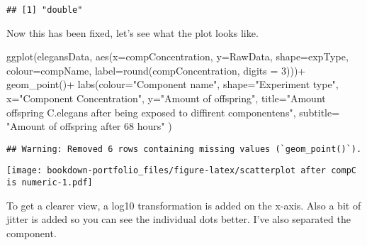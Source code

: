 \documentclass[
]{book}
\newenvironment{Shaded}{\begin{snugshade}}{\end{snugshade}}
\newcommand{\AttributeTok}[1]{\textcolor[rgb]{0.77,0.63,0.00}{#1}}
\newcommand{\DecValTok}[1]{\textcolor[rgb]{0.00,0.00,0.81}{#1}}
\newcommand{\FunctionTok}[1]{\textcolor[rgb]{0.00,0.00,0.00}{#1}}
\newcommand{\NormalTok}[1]{#1}
\newcommand{\SpecialCharTok}[1]{\textcolor[rgb]{0.00,0.00,0.00}{#1}}
\newcommand{\StringTok}[1]{\textcolor[rgb]{0.31,0.60,0.02}{#1}}
\begin{document}
\begin{verbatim}
## [1] "double"
\end{verbatim}

Now this has been fixed, let's see what the plot looks like.

\begin{Shaded}
\begin{Highlighting}[]
\FunctionTok{ggplot}\NormalTok{(elegansData, }\FunctionTok{aes}\NormalTok{(}\AttributeTok{x=}\NormalTok{compConcentration, }\AttributeTok{y=}\NormalTok{RawData, }\AttributeTok{shape=}\NormalTok{expType, }\AttributeTok{colour=}\NormalTok{compName, }\AttributeTok{label=}\FunctionTok{round}\NormalTok{(compConcentration, }\AttributeTok{digits =} \DecValTok{3}\NormalTok{)))}\SpecialCharTok{+}
  \FunctionTok{geom\_point}\NormalTok{()}\SpecialCharTok{+}
  \FunctionTok{labs}\NormalTok{(}\AttributeTok{colour=}\StringTok{"Component name"}\NormalTok{, }\AttributeTok{shape=}\StringTok{"Experiment type"}\NormalTok{,}
       \AttributeTok{x=}\StringTok{"Component Concentration"}\NormalTok{,}
       \AttributeTok{y=}\StringTok{"Amount of offspring"}\NormalTok{,}
       \AttributeTok{title=}\StringTok{"Amount offspring C.elegans after being exposed to diffirent componentens"}\NormalTok{,}
       \AttributeTok{subtitle=} \StringTok{"Amount of offspring after 68 hours"}
\NormalTok{)}
\end{Highlighting}
\end{Shaded}

\begin{verbatim}
## Warning: Removed 6 rows containing missing values (`geom_point()`).
\end{verbatim}

\texttt{[image: bookdown-portfolio\_files/figure-latex/scatterplot after compC is numeric-1.pdf]}

To get a clearer view, a log10 transformation is added on the x-axis. Also a bit of jitter is added so you can see the individual dots better. I've also separated the component.
\end{document}
